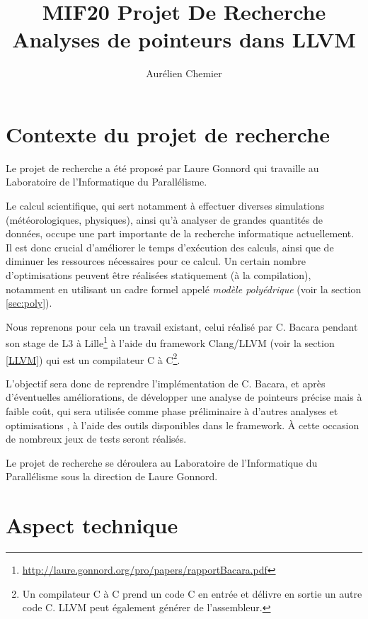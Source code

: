 \documentclass[a4paper,11pt]{article}
\title{\textbf{MIF20 Projet De Recherche} \\  
\textbf {Analyses de pointeurs dans LLVM} }
\author{Aurélien Chemier}
\date{}
\begin{document}
\pagestyle{fancy}
\makeatletter
\maketitle

\tableofcontents
\newpage

\section{Contexte du projet de recherche}

Le projet de recherche a été proposé par Laure Gonnord qui travaille au Laboratoire de l'Informatique du Parallélisme.

Le calcul scientifique, qui sert notamment à effectuer diverses simulations (météorologiques, physiques), ainsi qu'à analyser de grandes quantités de données, occupe une part importante de la recherche informatique actuellement.
Il est donc crucial d'améliorer le temps d'exécution des calculs, ainsi que de diminuer les ressources nécessaires pour ce calcul. 
 Un certain nombre d'optimisations peuvent être réalisées statiquement (à la
compilation), notamment en utilisant un cadre formel appelé
\emph{modèle polyédrique} (voir la section \ref{sec:poly}). 

Nous reprenons pour cela un travail existant, celui réalisé par C. Bacara pendant son stage de L3 à
Lille\footnote{\url{http://laure.gonnord.org/pro/papers/rapportBacara.pdf}}
 à l'aide du framework Clang/LLVM (voir la section \ref{LLVM}) qui est un compilateur C à C\footnote{Un compilateur C à C prend un code C en entrée et délivre en sortie un autre code C. LLVM peut également générer de l'assembleur.}.
 
L'objectif sera donc de reprendre l'implémentation de C. Bacara, et après d'éventuelles améliorations, de développer une analyse de pointeurs précise  mais à faible coût, qui sera utilisée comme phase préliminaire à d'autres analyses et optimisations , à l'aide des outils disponibles dans le framework.
\`A cette occasion de nombreux jeux de tests seront réalisés.


Le projet de recherche se déroulera au Laboratoire de l'Informatique du Parallélisme sous la direction de Laure Gonnord.

\section{Aspect technique}
\end{document}
